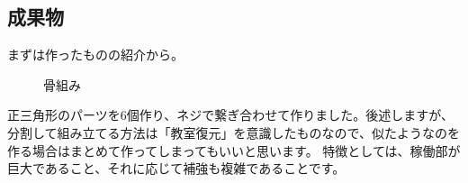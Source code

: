 \documentclass{jsarticle}
\begin{document}
\subsection{成果物}

まずは作ったものの紹介から。

\begin{figure}[htbp]
    \centering
    \caption[]{骨組み}
    \label{figs:骨組み}
\end{figure}

正三角形のパーツを6個作り、ネジで繋ぎ合わせて作りました。後述しますが、分割して組み立てる方法は「教室復元」を意識したものなので、似たようなのを作る場合はまとめて作ってしまってもいいと思います。
特徴としては、稼働部が巨大であること、それに応じて補強も複雑であることです。
\end{document}
